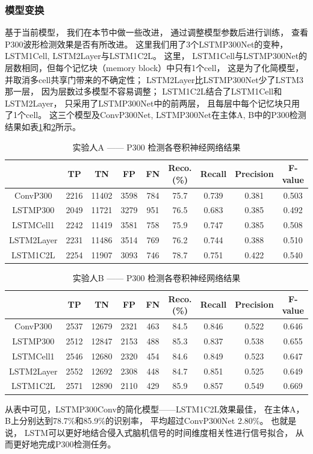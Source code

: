\subsubsection{模型变换}

基于当前模型， 我们在本节中做一些改进， 通过调整模型参数后进行训练， 查看P300波形检测效果是否有所改进。 这里我们用了3个LSTMP300Net的变种， LSTM1Cell, LSTM2Layer与LSTM1C2L。 这里，  LSTM1Cell与LSTMP300Net的层数相同，但每个记忆块（memory block）中只有1个cell， 这是为了化简模型， 并取消多cell共享门带来的不确定性； LSTM2Layer比LSTMP300Net少了LSTM3那一层， 因为层数过多模型不容易调整； LSTM1C2L结合了LSTM1Cell和LSTM2Layer， 只采用了LSTMP300Net中的前两层， 且每层中每个记忆块只用了1个cell。 这三个模型及ConvP300Net, LSTMP300Net在主体A, B中的P300检测结果如表\ref{tab:LSTM_multi_A}和\ref{tab:LSTM_multi_B}所示。

\begin{table}[ht]
\centering
  \caption{实验人A —— P300 检测各卷积神经网络结果}
  \begin{tabular}{|c||c|c|c|c|c|c|c|c|}
  \hline
   & TP & TN & FP & FN & Reco.(\%) & Recall & Precision & F-value \\
  \hline\hline
	ConvP300 & 2216 & 11402 & 3598 & 784 & 75.7  & 0.739  & 0.381  & 0.503 \\
	\hline
	LSTMP300 & 2049&	11721&	3279&	951&	76.5& 	0.683& 	0.385& 	0.492  \\
	\hline
	LSTMCell1 & 2242 & 11419 & 3581 &	758&	75.9 & 0.747 &	0.385& 0.508\\
	\hline
	LSTM2Layer & 2231	&11486&	3514&	769&	76.2& 	0.744& 	0.388& 	0.510 \\
	\hline
	LSTM1C2L & 2254&	11907&	3093&	746&	78.7& 	0.751& 	0.422& 	0.540  \\
	\hline
  \end{tabular}
  \centering \label{tab:LSTM_multi_A}
\end{table}


\begin{table}[ht]
\centering
  \caption{实验人B —— P300 检测各卷积神经网络结果}
  \begin{tabular}{|c||c|c|c|c|c|c|c|c|}
  \hline
   & TP & TN & FP & FN & Reco.(\%) & Recall & Precision & F-value \\
  \hline\hline
  	ConvP300 & 2537 & 12679 & 2321 & 463 & 84.5 & 0.846 & 0.522 & 0.646 \\
	\hline
	LSTMP300 & 2512	&12847	&2153	&488	&85.3 &	0.837 &	0.538 &	0.655   \\
	\hline
	LSTMCell1 & 2546&	12680	&2320	&454	&84.6 &	0.849 &	0.523 &	0.647 \\
	\hline
	LSTM2Layer & 2552&	12692&	2308&448	&84.7 &	0.851 	&0.525& 	0.649  \\
	\hline
	LSTM1C2L & 2571	&12890&	2110&	429	&85.9 &	0.857 &	0.549 &	0.669 \\
  \hline
  \end{tabular}
  \centering \label{tab:LSTM_multi_B}
\end{table}


从表中可见，LSTMP300Conv的简化模型——LSTM1C2L效果最佳， 在主体A，B上分别达到78.7\%和85.9\%的识别率， 平均超过ConvP300Net 2.80\%。 也就是说， LSTM可以更好地结合侵入式脑机信号的时间维度相关性进行信号拟合， 从而更好地完成P300检测任务。